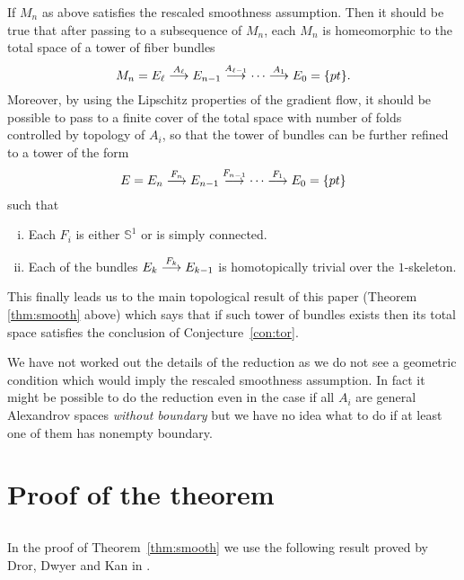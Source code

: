 \documentclass{amsart}
\begin{document}
If $M_n$ as above satisfies the rescaled smoothness assumption.
Then it should be true that after passing to a subsequence of $M_n$,
each $M_n$ is homeomorphic to the total space of a tower of fiber bundles
\[
M_n=E_\ell\buildrel {A_\ell}\over \longrightarrow E_{n-1}\buildrel {A_{\ell-1}}\over\longrightarrow\dots\buildrel {A_1}\over\longrightarrow E_0=\{pt\}.
\]
Moreover, by using the Lipschitz properties of the gradient flow,
it should be possible to pass to a finite cover of the total space with number of folds controlled by topology of $A_i$, so that the tower of bundles can be
further refined  to a tower of the form
\[
E=E_n\buildrel {F_n}\over \longrightarrow E_{n-1}\buildrel {F_{n-1}}\over\longrightarrow\dots\buildrel {F_1}\over\longrightarrow E_0=\{pt\}
\]
such that
\begin{enumerate}[(i)]
\item Each $F_i$ is either $\mathbb{S}^{1}$ or is simply connected. 
\item Each of the bundles $E_k\buildrel {F_k}\over \longrightarrow E_{k-1}$ is homotopically trivial over the $1$-skeleton. 
\end{enumerate}

This finally leads us to the main topological result of this paper (Theorem \ref{thm:smooth} above) which says that if such tower of bundles exists then its total space satisfies the conclusion of Conjecture~\ref{con:tor}.

We have not worked out the details of the reduction as we do not see a geometric condition which would imply the rescaled smoothness assumption.
In fact it might  be possible to do the reduction even in the case if all $A_i$ are general  Alexandrov spaces  \emph{without  boundary} but we have no idea what to do if at least one of them has nonempty boundary.


\section{Proof of the theorem}

\subsection{}
In the proof of Theorem~\ref{thm:smooth} we use the following result proved by Dror,  Dwyer and Kan in \cite{DDK}.



\small

%
\end{document}
